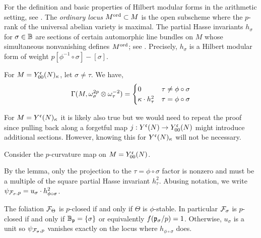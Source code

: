 \documentclass[main.tex]{subfiles}
\begin{document}
{\color{red}
For the definition and basic properties of Hilbert modular forms in the arithmetic setting, see \cite[\S2]{goren:lectures_HMV}. The \textit{ordinary locus} $M^{\operatorname{\mathrm{ord}}} \subset M$ is the open subscheme where the $p$-rank of the universal abelian variety is maximal. The partial Hasse invariants $h_{\sigma}$ for $\sigma \in \mathbb{B}$ are sections of certain automorphic line bundles on $M$ whose simultaneous nonvanishing defines $M^{\operatorname{\mathrm{ord}}}$; see \cite[\S2.3]{goren:lectures_HMV}. Precisely, $h_\sigma$ is a Hilbert modular form of weight $p \left[ \phi^{-1} \circ \sigma \right] - \left[ \sigma \right]$.  

\begin{lemma} \cite[Lemma~3.4.1]{goren_deshalit:foliations_shimura}
For $M = Y^{\mathfrak{c}}_{00}(N)_{\kappa}$, let $\sigma \neq \tau$. We have,
\[ \Gamma(M, \omega_{\sigma}^{2p} \otimes \omega_{\tau}^{-2}) = 
\begin{cases}
0 & \tau \neq \phi \circ \sigma
\\
\kappa \cdot h_{\tau}^2 & \tau = \phi \circ \sigma
\end{cases} \]
\end{lemma} 

For $M = Y^{\mathfrak{c}}(N)_{\kappa}$ it is likely also true but we would need to repeat the proof since pulling back along a forgetful map $j : Y^{\mathfrak{c}}(N) \to Y^{\mathfrak{c}}_{00}(N)$ might introduce additional sections. However, knowing this for $Y^{\mathfrak{c}}(N)_{\kappa}$ will not be necessary.


Consider the $p$-curvature map on $M = Y^{\mathfrak{c}}_{00}(N)$.
\begin{center}
\end{center}
By the lemma, only the projection to the $\tau = \phi \circ \sigma$ factor is nonzero and must be a multiple of the square partial Hasse invariant $h_{\tau}^2$. Abusing notation, we write $\psi_{\mathcal{F}_{\sigma}, p} = u_{\sigma} \cdot h_{\phi \circ \sigma}^2$.

\begin{theorem} \label{thm:p_closed_tautologicial_foliations}
The foliation $\mathcal{F}_{\Theta}$ is $p$-closed if and only if $\Theta$ is $\phi$-stable. In particular $\mathcal{F}_{\sigma}$ is $p$-closed if and only if $\mathbb{B}_{\mathfrak{p}} = \{ \sigma \}$ or equivalently $f(\mathfrak{p}_{\sigma}/p) = 1$. Otherwise, $u_{\sigma}$ is a unit so $\psi_{\mathcal{F}_{\sigma}, p}$ vanishes exactly on the locus where $h_{\phi \circ \sigma}$ does. 
\end{theorem}

}
\end{document}
